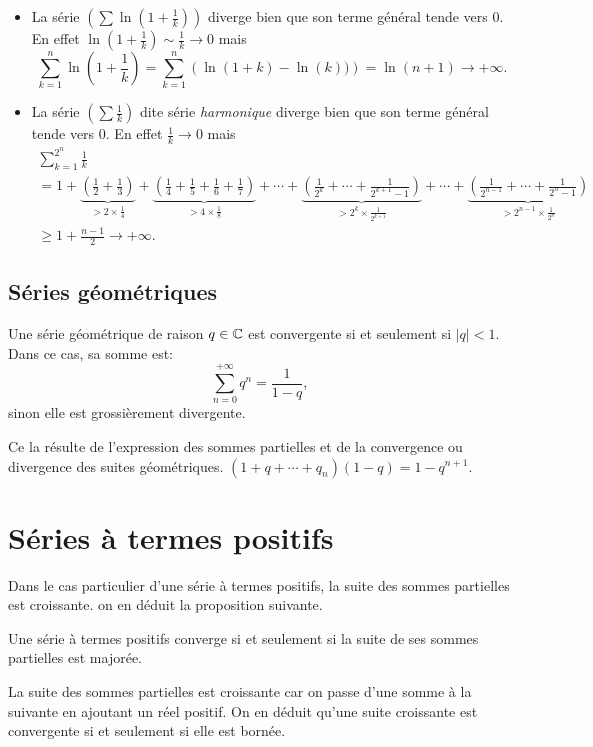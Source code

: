\begin{itemize}
 \item La série $\left( \sum \ln(1+\frac{1}{k}) \right)$ diverge bien que son terme général tende vers $0$. En effet $\ln(1+\frac{1}{k}) \sim \frac{1}{k} \rightarrow 0$ mais 
 \[
  \sum_{k=1}^{n}\ln(1+\frac{1}{k}) = \sum_{k=1}^{n}\left( \ln(1+k) - \ln(k))\right) = \ln(n+1) \rightarrow +\infty. 
 \]
 
 \item La série $\left( \sum \frac{1}{k} \right)$ dite série \emph{harmonique}  diverge bien que son terme général tende vers $0$. En effet $\frac{1}{k} \rightarrow 0$ mais
 \begin{multline*}
  \sum_{k=1}^{2^n}\frac{1}{k}\\  
  = 1 
  + \underset{> 2\times \frac{1}{4}}{\underbrace{\left( \frac{1}{2} + \frac{1}{3}\right)}} 
  + \underset{> 4 \times\frac{1}{8}}{\underbrace{\left( \frac{1}{4} + \frac{1}{5} + \frac{1}{6} +\frac{1}{7}\right)}}
  + \cdots 
  + \underset{> 2^k \times \frac{1}{2^{k+1}}}{\underbrace{\left( \frac{1}{2^{k}} + \cdots + \frac{1}{2^{k+1}-1}\right)}} + \cdots 
  + \underset{> 2^{n-1} \times \frac{1}{2^{n}}}{\underbrace{\left( \frac{1}{2^{n-1}} + \cdots + \frac{1}{2^{n}-1}\right)}}\\
  \geq 1 + \frac{n-1}{2} \rightarrow + \infty.
 \end{multline*}
\end{itemize}

\subsection{Séries géométriques}
Une série géométrique de raison $q \in \mathbb{C}$ est convergente si et seulement si $|q|<1$. Dans ce cas, sa somme est:
\begin{displaymath}
  \sum_{n=0}^{+\infty} q^n = \frac{1}{1-q},
\end{displaymath}
sinon elle est grossièrement divergente.
\begin{demo}
Ce la résulte de l'expression des sommes partielles et de la convergence ou divergence des suites géométriques.  $(1+q+\cdots + q_n)(1-q) = 1- q^{n+1}$.
\end{demo}


\section{Séries à termes positifs}
Dans le cas particulier d'une série à termes positifs, la suite des sommes partielles est croissante. on en déduit la proposition suivante.
\begin{prop}
  Une série à termes positifs converge si et seulement si la suite de ses sommes partielles est majorée.
\end{prop}
\begin{demo}
 La suite des sommes partielles est croissante car on passe d'une somme à la suivante en ajoutant un réel positif. On en déduit qu'une suite croissante est convergente si et seulement si elle est bornée.
\end{demo}

